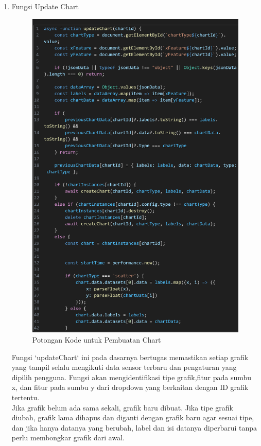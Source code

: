 \begin{enumerate}
	\item Fungsi Update Chart\\
		\begin{figure}[H]
		\centering
		\includegraphics[width=0.8\linewidth]{gambar/Pembahasan/update data cjs.png}
		\caption{Potongan Kode untuk Pembuatan Chart}
		\label{Potongan Kode untuk Pembuatan Chart}
	\end{figure}
	
	Fungsi `updateChart` ini pada dasarnya bertugas memastikan setiap grafik yang tampil selalu mengikuti data sensor terbaru dan pengaturan yang dipilih pengguna. Fungsi akan mengidentifikasi tipe grafik,fitur pada sumbu x, dan fitur pada sumbu y dari dropdown yang berkaitan dengan ID grafik tertentu.\\
	Jika grafik belum ada sama sekali, grafik baru dibuat. Jika tipe grafik diubah, grafik lama dihapus dan diganti dengan grafik baru agar sesuai tipe, dan jika hanya datanya yang berubah, label dan isi datanya diperbarui tanpa perlu membongkar grafik dari awal. 
\end{enumerate}

